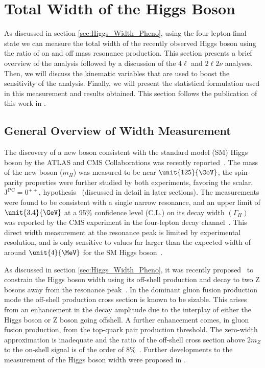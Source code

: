 \chapter{Total Width of the Higgs Boson}
\label{sec:Width_Experiment}

As discussed in section \ref{sec:Higgs_Width_Pheno}, using the four lepton final state we can measure the total width of the recently observed Higgs boson using the ratio of on and off mass resonance production. This section presents a brief overview of the analysis followed by a discussion of the $4\ell$ and $2\ell2\nu$ analyses. Then, we will discuss the kinematic variables that are used to boost the sensitivity of the analysis. Finally, we will present the statistical formulation used in this measurement and results obtained. This section follows the publication of this work in \cite{Khachatryan:2014iha}.

\section{General Overview of Width Measurement}
\label{sec:General_H_ZZ_Width}

The discovery of a new boson consistent with the standard model (SM) Higgs boson by the ATLAS and CMS Collaborations was recently reported~\cite{Aad:2012tfa, Chatrchyan:2012ufa, Chatrchyan:2013lba}. The mass of the new boson ($m_{H}$) was measured to be near $\unit{125}{\GeV}$, the spin-parity properties were further studied by both experiments, favoring the scalar, $\mathrm{J}^{\mathrm{PC}} = 0^{++}$, hypothesis~\cite{Chatrchyan:2012jja,Aad:2013wqa,Aad:2013xqa,Chatrchyan:2013mxa} (discussed in detail in later sections). The measurements were found to be consistent with a single narrow resonance, and an upper limit of $\unit{3.4}{\GeV}$ at a 95\% confidence level (C.L.) on its decay width $\left(\Gamma_{H}\right)$ was reported by the CMS experiment in the four-lepton decay channel~\cite{Chatrchyan:2013mxa}. This direct width measurement at the resonance peak is limited by experimental resolution, and is only sensitive to values far larger than the expected width of around $\unit{4}{\MeV}$ for the SM Higgs boson~\cite{Dittmaier:2011ti,Heinemeyer:2013tqa}.

As discussed in section \ref{sec:Higgs_Width_Pheno}, it was recently proposed~\cite{Caola:2013yja} to constrain the Higgs boson width using its
off-shell production and decay to two Z bosons away from the resonance peak~\cite{Kauer:2012hd}.
In the dominant gluon fusion production mode the off-shell production cross section is known to be
sizable. This arises from an enhancement in the decay amplitude due to the interplay of either the Higgs boson or Z boson going offshell. A further enhancement comes, in gluon fusion production, from the top-quark
pair production threshold. The zero-width approximation is inadequate and the ratio of the off-shell
cross section above $2m_{Z}$ to the on-shell signal is of the order of 8\%~\cite{Kauer:2012hd,Kauer:2013cga}.
Further developments to the measurement of the Higgs boson width were proposed in \cite{Campbell:2013una,Passarino:2013bha}.

